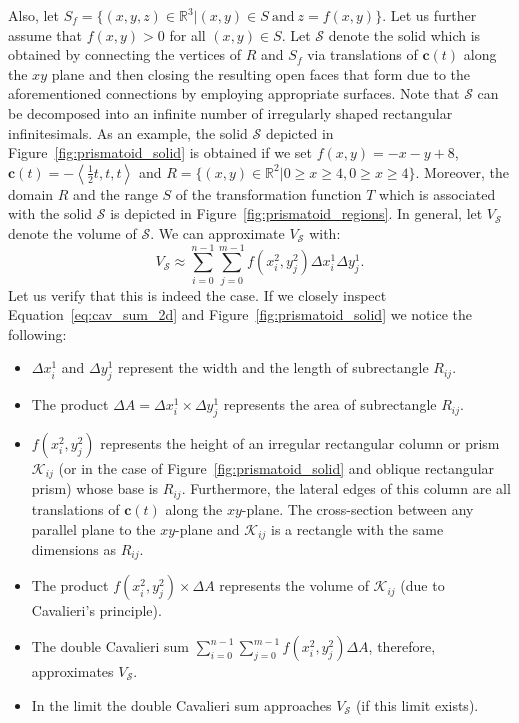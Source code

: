 \documentclass{article}
\theoremstyle{theorem}
\theoremstyle{definition}
\begin{document}
\noindent
Also, let $S_f = \{(x,y,z)\in\mathbb{R}^3|(x,y)\in S ~ \textrm{and} ~ z=f(x,y)\}$.  Let us further assume that $f(x,y) > 0$ for all $(x,y)\in S$. Let $\mathcal{S}$ denote the solid which is obtained by connecting the vertices of $R$ and 
$S_f$ via translations of $\mathbf{c}(t)$ along the $xy$ plane and then closing the resulting open faces that form due to the aforementioned connections by employing appropriate surfaces. Note that 
$\mathcal{S}$ can be decomposed into an infinite number of irregularly shaped rectangular infinitesimals. As an example, the solid $\mathcal{S}$ depicted in Figure~\ref{fig:prismatoid_solid} is obtained if we set $f(x,y) = -x - y + 8$, $\mathbf{c}(t) = -\left<\frac{1}{2}t,t,t\right>$ and $R = \{(x,y)\in\mathbb{R}^2|0 \geq x \geq 4, 0 \geq x \geq 4\} \nonumber$.
Moreover, the domain $R$ and the range $S$ of the transformation function $T$ which is associated with the solid $\mathcal{S}$ is depicted in Figure~\ref{fig:prismatoid_regions}.  
In general, let $V_{\mathcal{S}}$ denote the volume of $\mathcal{S}$. We can approximate $V_{\mathcal{S}}$ with:
\begin{equation}
\label{eq:cav_sum_2d}
V_{\mathcal{S}} \approx \sum_{i=0}^{n-1} \sum_{j=0}^{m-1} f(x_i^2,y_j^2) \Delta x_i^1 \Delta y_j^1.
\end{equation}
Let us verify that this is indeed the case. If we closely inspect Equation~\ref{eq:cav_sum_2d} and Figure~\ref{fig:prismatoid_solid} we notice the following:
\begin{itemize}
\item $\Delta x_i^1$ and $\Delta y_j^1$ represent the width and the length of subrectangle $R_{ij}$.
\item The product $\Delta A = \Delta x_i^1\times \Delta y_j^1$ represents the area of subrectangle $R_{ij}$.
\item $f(x_i^2,y_j^2)$ represents the height of an irregular rectangular column or prism $\mathcal{K}_{ij}$ (or in the case of Figure~\ref{fig:prismatoid_solid} and oblique rectangular prism) whose base is $R_{ij}$. Furthermore, the lateral edges of this column are all translations 
of $\mathbf{c}(t)$ along the $xy$-plane. The cross-section between any parallel plane to the $xy$-plane and $\mathcal{K}_{ij}$ is a rectangle with the same dimensions as $R_{ij}$. 
\item The product $f(x_i^2,y_j^2)\times \Delta A$ represents the volume of $\mathcal{K}_{ij}$ (due to Cavalieri's principle).
\item The double Cavalieri sum $\sum_{i=0}^{n-1} \sum_{j=0}^{m-1} f(x_i^2,y_j^2) \Delta A$, therefore, approximates $V_{\mathcal{S}}$. 
\item In the limit the double Cavalieri sum approaches $V_{\mathcal{S}}$ (if this limit exists). 
\end{itemize}
\end{document}
